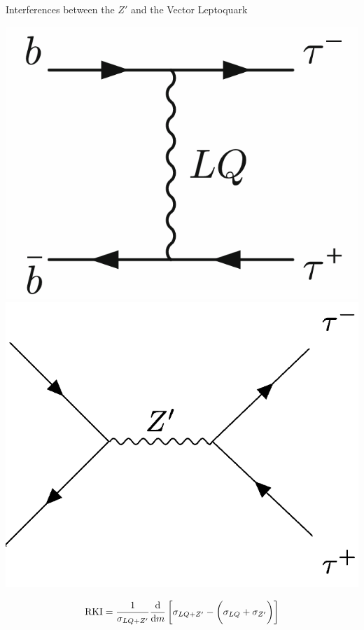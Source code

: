 \documentclass{../bredelebeamer}
\begin{document}
\begin{frame}{Interferences between the $Z'$ and the Vector Leptoquark}

    \begin{minipage}{.48\linewidth}
		\begin{center}
            \includegraphics[width=.62\linewidth]{../2023_paper/non_resonant.png}
			\includegraphics[width=.6\linewidth]{../2023_paper/Zp.png}
		\end{center}
		\begin{equation*}
			\mathrm{RKI}
            =\frac{1}{\sigma_{ LQ+Z'}}
            \dv{m}\left[
                \sigma_{ LQ+Z'}-\left(\sigma_{ LQ} +\sigma_{Z'}
                \vphantom{\frac{1}2}
                \right)
                \right]
		\end{equation*}
	\end{minipage}	
	\begin{minipage}{.50\linewidth}

\end{minipage}
\end{frame}
\end{document}
